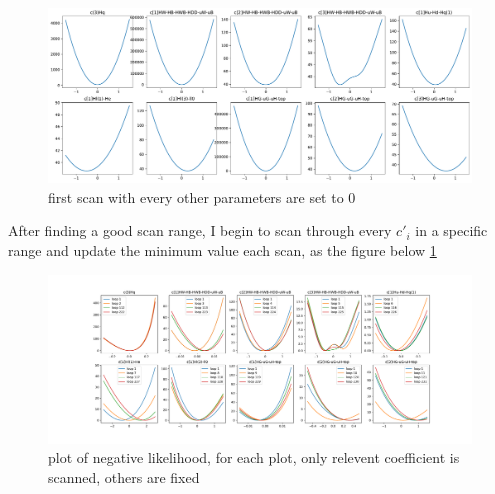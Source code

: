\documentclass{article}
\begin{document}
\begin{figure}[h!]
 \includegraphics[scale=0.4]{../rotated_parameter_guess.pdf}
 \caption{first scan with every other parameters are set to 0}
\end{figure}
\clearpage
After finding a good scan range, I begin to scan through every $c'_i$ in a specific range and update the minimum value each scan, as the figure below \ref{likelihood}
\begin{figure}[h!]
 \includegraphics[scale=0.35]{../likelihood.pdf}
 \caption{plot of negative likelihood, for each plot, only relevent coefficient is scanned, others are fixed\label{likelihood}}
\end{figure}
\end{document}
